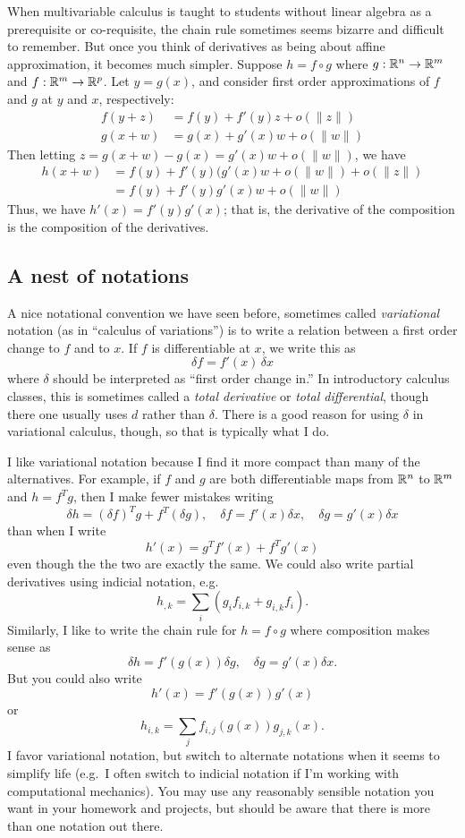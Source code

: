 \documentclass[12pt, leqno]{article} %
\begin{document}
When multivariable calculus is taught to students without linear
algebra as a prerequisite or co-requisite, the chain rule sometimes
seems bizarre and difficult to remember.  But once you think of
derivatives as being about affine approximation, it becomes much
simpler.  Suppose $h = f \circ g$ where
$g : \mathbb{R}^n \rightarrow \mathbb{R}^m$ and
$f : \mathbb{R}^m \rightarrow \mathbb{R}^p$.
Let $y = g(x)$, and consider first order approximations of $f$ and $g$
at $y$ and $x$, respectively:
\begin{align*}
  f(y+z) &= f(y) + f'(y) z + o(\|z\|) \\
  g(x+w) &= g(x) + g'(x) w + o(\|w\|)
\end{align*}
Then letting $z = g(x+w) - g(x) = g'(x) w + o(\|w\|)$, we have
\begin{align*}
  h(x+w)
  &= f(y) + f'(y) (g'(x) w + o(\|w\|) + o(\|z\|) \\
  &= f(y) + f'(y) g'(x) w + o(\|w\|)
\end{align*}
Thus, we have $h'(x) = f'(y) g'(x)$; that is, the derivative of the
composition is the composition of the derivatives.

\subsection*{A nest of notations}

A nice notational convention we have seen before, sometimes called
{\em variational} notation (as in ``calculus of variations'') is to
write a relation between a first order change to $f$ and to $x$.
If $f$ is differentiable at $x$, we write this as 
\[
  \delta f = f'(x) \, \delta x
\]
where $\delta$ should be interpreted as ``first order change in.''
In introductory calculus classes, this is sometimes called a
{\em total derivative} or {\em total differential}, though there one
usually uses $d$ rather than $\delta$.  There is a good reason for
using $\delta$ in variational calculus, though, so that is typically
what I do.

I like variational notation because I find it more compact than many
of the alternatives.  For example, if $f$ and $g$ are both
differentiable maps from $\mathbb{R}^n$ to $\mathbb{R}^m$ and $h = f^T g$,
then I make fewer mistakes writing
\[
\delta h = (\delta f)^T g + f^T (\delta g), \quad
\delta f = f'(x) \delta x, \quad \delta g = g'(x) \delta x
\]
than when I write
\[
  h'(x) = g^T f'(x) + f^T g'(x)
\]
even though the the two are exactly the same.  We could also
write partial derivatives using indicial notation, e.g.
\[
  h_{,k} = \sum_{i} (g_i f_{i,k} + g_{i,k} f_i).
\]
Similarly, I like to write the chain rule for $h = f \circ g$
where composition makes sense as
\[
  \delta h = f'(g(x)) \delta g, \quad
  \delta g = g'(x) \delta x.
\]
But you could also write
\[
  h'(x) = f'(g(x)) g'(x)
\]
or
\[
  h_{i,k} = \sum_{j} f_{i,j}(g(x)) g_{j,k}(x).
\]
I favor variational notation, but switch to alternate notations when
it seems to simplify life (e.g.~I often switch to indicial notation if
I'm working with computational mechanics).
You may use any reasonably sensible notation you want in your homework
and projects, but should be aware that there is more than one notation
out there.
\end{document}
